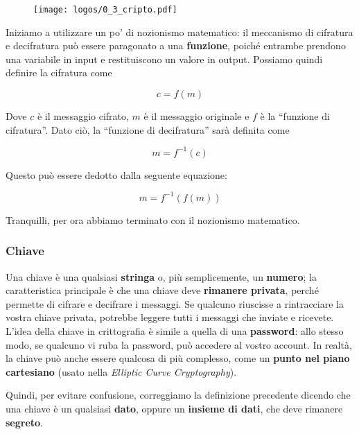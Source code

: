 \documentclass{report}
\begin{document}
\begin{figure}[h]
     \centering
    \texttt{[image: logos/0\_3\_cripto.pdf]}
\end{figure}


Iniziamo a utilizzare un po' di nozionismo matematico: il meccanismo di cifratura e decifratura può essere paragonato a una \textbf{funzione}, poiché entrambe prendono una variabile in input e restituiscono un valore in output. Possiamo quindi definire la cifratura come


\begin{equation*}
    c = f(m)
\end{equation*}

Dove $c$ è il messaggio cifrato, $m$ è il messaggio originale e $f$ è la “funzione di cifratura”. Dato ciò, la “funzione di decifratura” sarà definita come


\begin{equation*}
    m = f^{-1}(c)
\end{equation*}

Questo può essere dedotto dalla seguente equazione:


\begin{equation*}
    m = f^{-1}(f(m)) 
\end{equation*}

Tranquilli, per ora abbiamo terminato con il nozionismo matematico.


\subsubsection{Chiave} 

Una chiave è una qualsiasi \textbf{stringa} o, più semplicemente, un \textbf{numero}; la caratteristica principale è che una chiave deve \textbf{rimanere privata}, perché permette di cifrare e decifrare i messaggi. Se qualcuno riuscisse a rintracciare la vostra chiave privata, potrebbe leggere tutti i messaggi che inviate e ricevete. L’idea della chiave in crittografia è simile a quella di una \textbf{password}: allo stesso modo, se qualcuno vi ruba la password, può accedere al vostro account. In realtà, la chiave può anche essere qualcosa di più complesso, come un \textbf{punto nel piano cartesiano} (usato nella \textit{Elliptic Curve Cryptography}).

Quindi, per evitare confusione, correggiamo la definizione precedente dicendo che una chiave è un qualsiasi \textbf{dato}, oppure un \textbf{insieme di dati}, che deve rimanere \textbf{segreto}.
\end{document}

